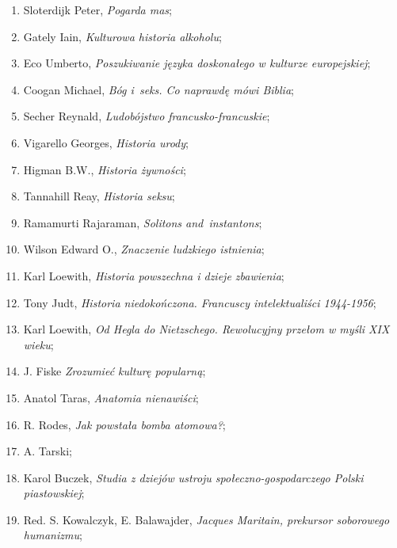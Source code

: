 \documentclass[a4paper,11pt]{article}
\begin{document}
\begin{enumerate}
\item Sloterdijk Peter, \emph{Pogarda mas};

\item Gately Iain, \emph{Kulturowa historia alkoholu};

\item Eco Umberto, \emph{Poszukiwanie języka doskonałego w kulturze
    europejskiej};

\item Coogan Michael, \emph{Bóg i~seks. Co naprawdę mówi Biblia};

\item Secher Reynald, \emph{Ludobójstwo francusko-francuskie};

\item Vigarello Georges, \emph{Historia urody};

\item Higman B.W., \emph{Historia żywności};

\item Tannahill Reay, \emph{Historia seksu};

\item Ramamurti Rajaraman, \emph{Solitons and~instantons};

\item Wilson Edward O., \emph{Znaczenie ludzkiego istnienia};

\item Karl Loewith, \emph{Historia powszechna i dzieje zbawienia};

\item Tony Judt, \emph{Historia niedokończona. Francuscy
    intelektualiści 1944-1956};

\item Karl Loewith, \emph{Od Hegla do Nietzschego. Rewolucyjny przełom
    w myśli XIX wieku};

\item J. Fiske \emph{Zrozumieć kulturę popularną};

\item Anatol Taras, \emph{Anatomia nienawiści};

\item R. Rodes, \emph{Jak powstała bomba atomowa?};

\item A. Tarski;

\item Karol Buczek, \emph{Studia z dziejów ustroju
    społeczno-gospodarczego Polski piastowskiej};

\item Red. S. Kowalczyk, E. Balawajder, \emph{Jacques Maritain,
    prekursor soborowego humanizmu};


\end{enumerate}
\end{document}
